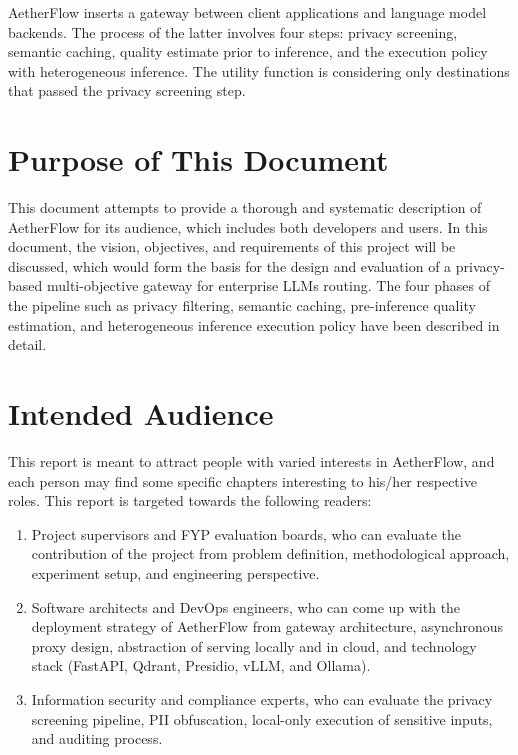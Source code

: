 \documentclass{FastFyp}
\begin{document}
AetherFlow inserts a gateway between client applications and language model backends. The process of the latter involves four steps: privacy screening, semantic caching, quality estimate prior to inference, and the execution policy with heterogeneous inference. The utility function is considering only destinations that passed the privacy screening step.
\section{Purpose of This Document}
\label{sec:purpose}

This document attempts to provide a thorough and systematic description of AetherFlow for its audience, which includes both developers and users. In this document, the vision, objectives, and requirements of this project will be discussed, which would form the basis for the design and evaluation of a privacy-based multi-objective gateway for enterprise LLMs routing. The four phases of the pipeline such as privacy filtering, semantic caching, pre-inference quality estimation, and heterogeneous inference execution policy have been described in detail.
\section{Intended Audience}
\label{sec:audience}

This report is meant to attract people with varied interests in AetherFlow, and each person may find some specific chapters interesting to his/her respective roles. This report is targeted towards the following readers:

\begin{enumerate}
    \item Project supervisors and FYP evaluation boards, who can evaluate the contribution of the project from problem definition, methodological approach, experiment setup, and engineering perspective.
    \item Software architects and DevOps engineers, who can come up with the deployment strategy of AetherFlow from gateway architecture, asynchronous proxy design, abstraction of serving locally and in cloud, and technology stack (FastAPI, Qdrant, Presidio, vLLM, and Ollama).
    \item Information security and compliance experts, who can evaluate the privacy screening pipeline, PII obfuscation, local-only execution of sensitive inputs, and auditing process.
\end{enumerate}
\end{document}
